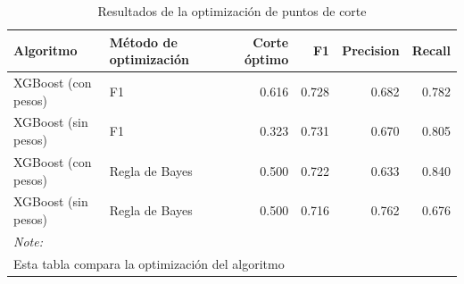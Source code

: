 \begin{table}[!h]
\centering
\caption{Resultados de la optimización de puntos de corte}
\centering
\begin{tabular}[t]{llrrrr}
\toprule
Algoritmo & Método de optimización & Corte óptimo & F1 & Precision & Recall\\
\midrule
XGBoost (con pesos) & F1 & 0.616 & 0.728 & 0.682 & 0.782\\
XGBoost (sin pesos) & F1 & 0.323 & 0.731 & 0.670 & 0.805\\
XGBoost (con pesos) & Regla de Bayes & 0.500 & 0.722 & 0.633 & 0.840\\
XGBoost (sin pesos) & Regla de Bayes & 0.500 & 0.716 & 0.762 & 0.676\\
\bottomrule
\multicolumn{6}{l}{\rule{0pt}{1em}\textit{Note: }}\\
\multicolumn{6}{l}{\rule{0pt}{1em}Esta tabla compara la optimización del algoritmo}\\
\end{tabular}
\end{table}
